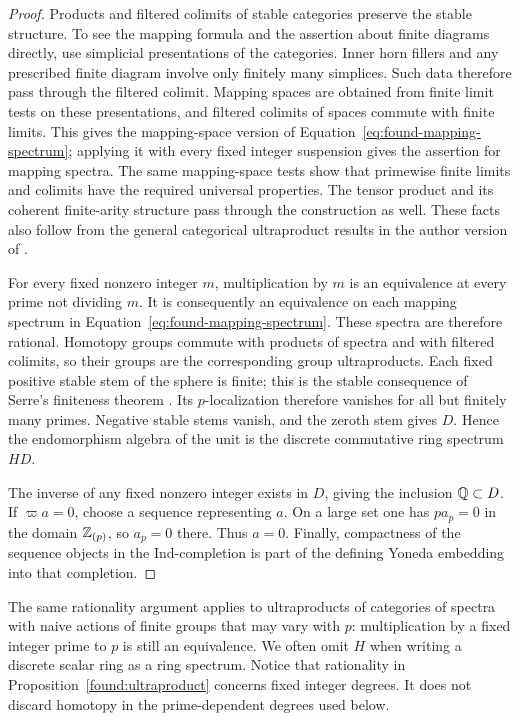 \begin{proof}
Products and filtered colimits of stable categories preserve the
stable structure.  To see the mapping formula and the assertion about
finite diagrams directly, use simplicial presentations of the
categories.  Inner horn fillers and any prescribed finite diagram
involve only finitely many simplices.  Such data therefore pass through
the filtered colimit.  Mapping spaces are obtained from finite limit
tests on these presentations, and filtered colimits of spaces commute
with finite limits.  This gives the mapping-space version of
Equation~\eqref{eq:found-mapping-spectrum}; applying it with every
fixed integer suspension gives the assertion for mapping spectra.
The same mapping-space tests show that primewise finite limits and
colimits have the required universal properties.  The tensor product
and its coherent finite-arity structure pass through the construction
as well.  These facts also follow from the general categorical
ultraproduct results in the author version of
\cite[Proposition~3.12, Corollary~3.16, and Lemma~3.17]{BSS2020}.

For every fixed nonzero integer $m$, multiplication by $m$ is an
equivalence at every prime not dividing $m$.  It is consequently an
equivalence on each mapping spectrum in
Equation~\eqref{eq:found-mapping-spectrum}.  These spectra are therefore
rational.  Homotopy groups commute with products of spectra and with
filtered colimits, so their groups are the corresponding group
ultraproducts.  Each fixed positive stable stem of the sphere is finite;
this is the stable consequence of Serre's finiteness theorem
\cite[Chapter~V, \S3, Proposition~3]{Serre1951}.  Its $p$-localization
therefore vanishes for all but finitely many primes.  Negative stable
stems vanish, and the zeroth stem gives $D$.  Hence the endomorphism
algebra of the unit is the discrete commutative ring spectrum $HD$.

The inverse of any fixed nonzero integer exists in $D$, giving the
inclusion $\mathbb Q\subset D$.  If $\varpi a=0$, choose a sequence
representing $a$.  On a large set one has $p a_p=0$ in the domain
$\mathbb Z_{(p)}$, so $a_p=0$ there.  Thus $a=0$.  Finally, compactness of
the sequence objects in the Ind-completion is part of the defining
Yoneda embedding into that completion.
\end{proof}

The same rationality argument applies to ultraproducts of categories
of spectra with naive actions of finite groups that may vary with
$p$: multiplication by a fixed integer prime to $p$ is still an
equivalence.  We often omit $H$ when writing a discrete scalar ring
as a ring spectrum.  Notice that rationality in Proposition~\ref{found:ultraproduct}
concerns fixed integer degrees.  It does not discard homotopy in the
prime-dependent degrees used below.

